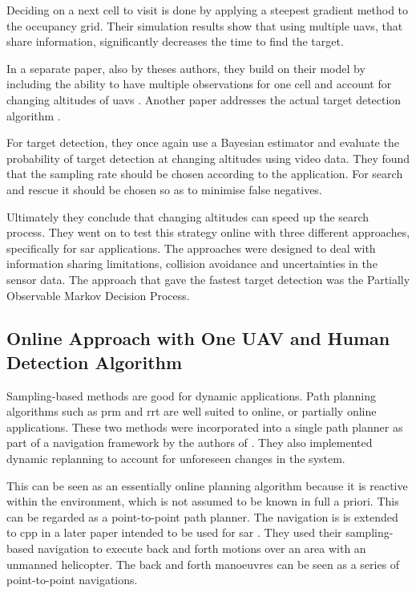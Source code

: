 Deciding on a next cell to visit is done by applying a steepest gradient method to the occupancy grid. Their simulation results show that using multiple \acp{uav}, that share information, significantly decreases the time to find the target.

In a separate paper, also by theses authors, they build on their model by including the ability to have multiple observations for one cell and account for changing altitudes of \acp{uav} \cite{Waharte2010}. Another paper addresses the actual target detection algorithm \cite{Symington2010}.

For target detection, they once again use a Bayesian estimator and evaluate the probability of target detection at changing altitudes using video data. They found that the sampling rate should be chosen according to the application. For search and rescue it should be chosen so as to minimise false negatives.

Ultimately they conclude that changing altitudes can speed up the search process. They went on to test this strategy online with three different approaches, specifically for \acl{sar} applications. The approaches were designed to deal with information sharing limitations, collision avoidance and uncertainties in the sensor data. The approach that gave the fastest target detection was the Partially Observable Markov Decision Process. \cite{WaharteFINAL2010} 

\subsection{Online Approach with One UAV and Human Detection Algorithm}
\label{sec:LR SAR-Sampling}
Sampling-based methods are good for dynamic applications. Path planning algorithms such as \ac{prm} and \ac{rrt} are well suited to online, or partially online applications. These two methods were incorporated into a single path planner as part of a navigation framework by the authors of \cite{Wzorek2006}. They also implemented dynamic replanning to account for unforeseen changes in the system. 

This can be seen as an essentially online planning algorithm because it is reactive within the environment, which is not assumed to be known in full a priori. This can be regarded as a point-to-point path planner. The navigation is is extended to \ac{cpp} in a later paper intended to be used for \ac{sar} \cite{Rudol2008}. They used their sampling-based navigation to execute back and forth motions over an area with an unmanned helicopter. The back and forth manoeuvres can be seen as a series of point-to-point navigations. 

